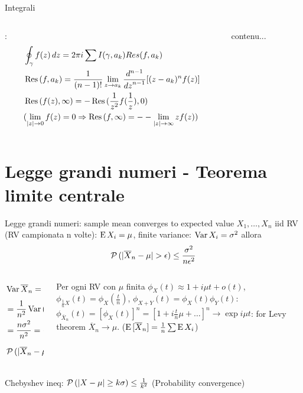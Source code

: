 \documentclass[asd-beamer.tex]{subfiles}
\begin{document}
\begin{frame}{Integrali}\frameintoc
\begin{columns}[T]
\begin{column}{0.5\textwidth}
:
\begin{align*}
&\oint_{\gamma}f(z)\,dz=2\pi i\sum I(\gamma,a_k)Res(f,a_k)\\
&\operatorname{Res}{(f, a_k)}=\frac{1}{(n-1)!}\lim_{z\to a_k}\frac{d^{n-1}}{{d z}^{n-1}}[(z-a_k)^nf(z)]\\
&\operatorname{Res}{(f(z),\infty)}=-\operatorname{Res}{(\frac{1}{z^2}f(\frac{1}{z}),0)}\\
&(\lim_{|z|\to0}f(z)=0\Rightarrow\operatorname{Res}{(f,\infty)}=--\lim_{|z|\to\infty}zf(z))
\end{align*}
\end{column}
\begin{column}{0.5\textwidth}
	contenu...
\end{column}
\end{columns}
\end{frame}

\section{Legge grandi numeri - Teorema limite centrale}

\begin{frame}{Legge grandi numeri: sample mean converges to expected value}
$X_1,\ldots,X_n$ iid RV (RV campionata n volte): $\operatorname{E}{X_i}=\mu$, finite variance: $\operatorname{Var}{X_i}=\sigma^2$ allora \[\prob{(|\overline{X}_n-\mu|>\epsilon)}\leq\frac{\sigma^2}{n\epsilon^2}\]
    \begin{columns}
    \begin{column}{0.4\textwidth}
\begin{align*}
&\var{\overline{X}_n}=\var{\frac{1}{n}(X_1+\ldots+X_n)}\\
&=\frac{1}{n^2}\var{(X_1+\ldots+X_n)}\\
&=\frac{n\sigma^2}{n^2}=\frac{\sigma^2}{n}\\
&\prob{(|\overline{X}_n-\mu|>\epsilon)}\leq\frac{\sigma^2}{n\epsilon^2}
\end{align*}
    \end{column}
    \begin{column}{0.6\textwidth}
Per ogni RV con $\mu$ finita 
$\phi_X(t)\approx1+i\mu t+o(t)$,$\phi_{\frac{1}{n}X}(t)=\phi_X(\frac{t}{n})$, $\phi_{X+Y}(t)=\phi_X(t)\phi_Y(t)$:
$\phi_{\overline{X}_n}(t)=[\phi_X(t)]^n=[1+i\frac{t}{n}\mu+\ldots]^n\to\exp{i\mu t}$: for Levy theorem $\overline{X}_n\to\mu$. ($\operatorname{E}{[\overline{X}_n]}=\frac{1}{n}\sum\operatorname{E}{X_i}$)
    \end{column}
    \end{columns}
Chebyshev ineq: $\operatorname{\mathcal{P}}{(|X-\mu|\geq k\sigma)}\leq\frac{1}{k^2}$ (Probability convergence)
\end{frame}
\end{document}
